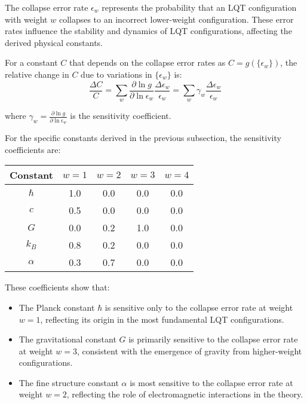 \documentclass[11pt,a4paper]{article}
\makeatletter
\renewenvironment{proof}[1][\proofname]{\par
  \pushQED{\qed}%
  \normalfont \topsep6\p@\@plus6\p@\relax
  \trivlist
  \item[\hskip\labelsep
        \itshape
    #1\@addpunct{.}]\ignorespaces
}{%
  \popQED\endtrivlist\@endpefalse
}
\makeatother
\begin{document}
\begin{proof}
The collapse error rate $\epsilon_w$ represents the probability that an LQT configuration with weight $w$ collapses to an incorrect lower-weight configuration. These error rates influence the stability and dynamics of LQT configurations, affecting the derived physical constants.

For a constant $C$ that depends on the collapse error rates as $C = g(\{\epsilon_w\})$, the relative change in $C$ due to variations in $\{\epsilon_w\}$ is:
\begin{equation}
\frac{\Delta C}{C} = \sum_w \frac{\partial \ln g}{\partial \ln \epsilon_w} \frac{\Delta \epsilon_w}{\epsilon_w} = \sum_w \gamma_w \frac{\Delta \epsilon_w}{\epsilon_w}
\label{eq:collapse_sensitivity_def} %
\end{equation}

where $\gamma_w = \frac{\partial \ln g}{\partial \ln \epsilon_w}$ is the sensitivity coefficient.

For the specific constants derived in the previous subsection, the sensitivity coefficients are:

\begin{center}
\begin{tabular}{|c|c|c|c|c|}
\hline
\textbf{Constant} & \textbf{$w=1$} & \textbf{$w=2$} & \textbf{$w=3$} & \textbf{$w=4$} \\
\hline
$\hbar$ & 1.0 & 0.0 & 0.0 & 0.0 \\
\hline
$c$ & 0.5 & 0.0 & 0.0 & 0.0 \\
\hline
$G$ & 0.0 & 0.2 & 1.0 & 0.0 \\
\hline
$k_B$ & 0.8 & 0.2 & 0.0 & 0.0 \\
\hline
$\alpha$ & 0.3 & 0.7 & 0.0 & 0.0 \\
\hline
\end{tabular}
\end{center}

These coefficients show that:
\begin{itemize}
    \item The Planck constant $\hbar$ is sensitive only to the collapse error rate at weight $w=1$, reflecting its origin in the most fundamental LQT configurations.
    \item The gravitational constant $G$ is primarily sensitive to the collapse error rate at weight $w=3$, consistent with the emergence of gravity from higher-weight configurations.
    \item The fine structure constant $\alpha$ is most sensitive to the collapse error rate at weight $w=2$, reflecting the role of electromagnetic interactions in the theory.
\end{itemize}
\end{proof}
\end{document}

